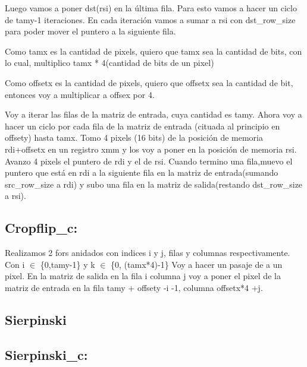 \documentclass[a4paper]{article}
\begin{document}
Luego vamos a poner dst(rsi) en la última fila.
Para esto vamos a hacer un ciclo de tamy-1 iteraciones.
En cada iteración vamos a sumar a rsi con dst\_row\_size para poder mover el puntero a la siguiente fila.

Como tamx es la cantidad de pixels, quiero que tamx sea la cantidad de bits,  con lo cual, multiplico tamx * 4(cantidad de bits de un pixel) 

Como offsetx es la cantidad de pixels, quiero que offsetx sea la cantidad de bit, entonces voy a multiplicar a offsex por 4.

Voy a iterar las filas de la matriz de entrada, cuya cantidad es tamy.\newline
Ahora voy a hacer un ciclo por cada fila de la matriz de entrada (cituada al principio en offsety) hasta tamx.\newline
Tomo 4 pixels (16 bits) de la posición de memoria rdi+offsetx en un registro xmm y los voy a poner en la posición de memoria rsi.\newline
Avanzo 4 pixels el puntero de rdi y el de rsi. \newline
Cuando termino una fila,muevo el puntero que está en rdi a la siguiente fila en la matriz de entrada(sumando src\_row\_size a rdi) y subo una fila en la matriz de salida(restando dst\_row\_size a rsi).\newline


\subsection{Cropflip\_c:}

Realizamos 2 fors anidados con indices i y j, filas y columnas respectivamente. Con i $\in$ \{0,tamy-1\} y k $\in$ \{0, (tamx*4)-1\} \newline
Voy a hacer un pasaje de a un pixel.
En la matriz de salida en la fila i columna j voy a poner el pixel de la matriz de entrada en la fila tamy + offsety -i -1, columna offsetx*4 +j. 
\newline

\subsection{Sierpinski}
\subsection{Sierpinski\_c:}
\end{document}

